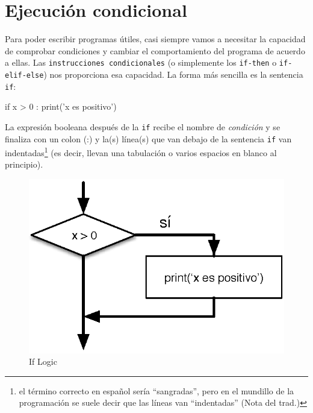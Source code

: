 \hypertarget{ejecuciuxf3n-condicional}{%
\section{Ejecución condicional}\label{ejecuciuxf3n-condicional}}

 
  

Para poder escribir programas útiles, casi siempre vamos a necesitar la
capacidad de comprobar condiciones y cambiar el comportamiento del
programa de acuerdo a ellas. Las \texttt{instrucciones\ condicionales}
(o simplemente los \texttt{if-then} o \texttt{if-elif-else}) nos proporciona esa capacidad. La forma más
sencilla es la sentencia \texttt{if}:

\begin{python}[frame=single]
if x > 0 :
    print('x es positivo')
\end{python}

La expresión booleana después de la \texttt{if} recibe el nombre de
\emph{condición} y se finaliza con un colon (:) y la(s) línea(s) que van
debajo de la sentencia \texttt{if} van indentadas\footnote{el término
  correcto en español sería ``sangradas'', pero en el mundillo de la
  programación se suele decir que las líneas van ``indentadas'' (Nota
  del trad.)} (es decir, llevan una tabulación o varios espacios en
blanco al principio).

\begin{figure}[t]
\centering
\includegraphics{images/if.eps}
\caption{If Logic}
\label{fig:if}
\end{figure}

